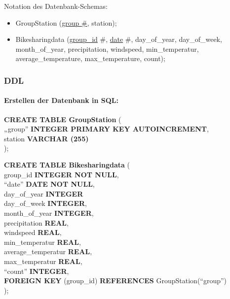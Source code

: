 \documentclass[11pt]{article}
\begin{document}
Notation des Datenbank-Schemas:

\begin{itemize}
    \item GroupStation (\underline{group \#}, station); \\
    \item Bikesharingdata (\underline{group\_id} \#, \underline{date} \#, day\_of\_year, day\_of\_week, month\_of\_year, precipitation, windspeed, min\_temperatur, \\ average\_temperature, max\_temperature, count);\\
\end{itemize}


\subsubsection{DDL}
\paragraph{Erstellen der Datenbank in SQL:\\}
\vspace{1em}

\textbf{CREATE TABLE GroupStation} ( \\
        „group” \textbf{INTEGER PRIMARY KEY AUTOINCREMENT},\\
        station \textbf{VARCHAR (255)}\\
    );
\vspace{1em}

    \textbf{CREATE TABLE Bikesharingdata} (\\
        group\_id \textbf{INTEGER NOT NULL}, \\
        “date” \textbf{DATE NOT NULL},\\
        day\_of\_year \textbf{INTEGER}\\
        day\_of\_week \textbf{INTEGER},\\
        month\_of\_year \textbf{INTEGER},\\
        precipitation \textbf{REAL},\\
        windspeed \textbf{REAL},\\
        min\_temperatur \textbf{REAL},\\
        average\_temperatur \textbf{REAL},\\
        max\_temperatur \textbf{REAL},\\
        “count” \textbf{INTEGER},\\
        \textbf{FOREIGN KEY} (group\_id) \textbf{REFERENCES} GroupStation(“group”)\\
    );\\
\vspace{1em}
    
\end{document}
